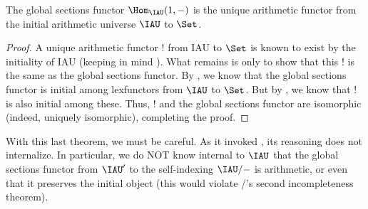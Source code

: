 \begin{theorem}
The global sections functor $\Hom_{\IAU}(1, -)$ is the unique arithmetic functor from the initial arithmetic universe $\IAU$ to $\Set$.
\end{theorem}
\begin{proof}
A unique arithmetic functor $!$ from IAU to $\Set$ is known to exist by the initiality of IAU (keeping in mind ). What remains is only to show that this $!$ is the same as the global sections functor. By , we know that the global sections functor is initial among lexfunctors from $\IAU$ to $\Set$. But by , we know that $!$ is also initial among these. Thus, $!$ and the global sections functor are isomorphic (indeed, uniquely isomorphic), completing the proof.
\end{proof}

With this last theorem, we must be careful. As it invoked , its reasoning does not internalize. In particular, we do NOT know internal to $\IAU$ that the global sections functor from $\IAU'$ to the self-indexing $\IAU/-$ is arithmetic, or even that it preserves the initial object (this would violate \Goedel/'s second incompleteness theorem).

